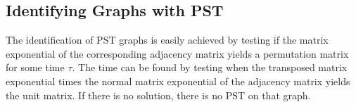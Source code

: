 \subsection{Identifying Graphs with PST}

\begin{center}
\end{center}

\noindent The identification of PST graphs is easily achieved by testing if the matrix exponential of the corresponding adjacency matrix yields a permutation matrix for some time $\tau$. The time can be found by testing when the transposed matrix exponential times the normal matrix exponential of the adjacency matrix yields the unit matrix. If there is no solution, there is no PST on that graph.



